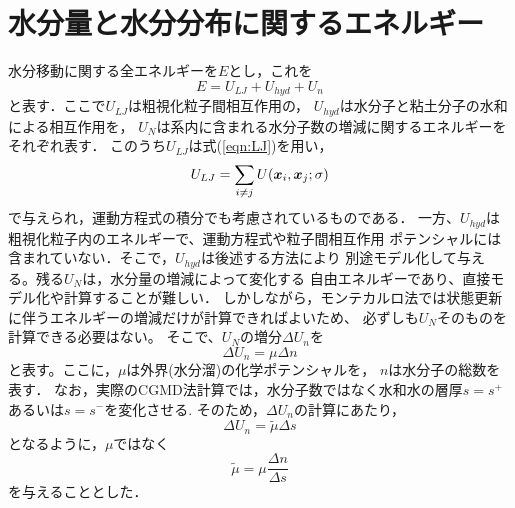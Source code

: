 \section{水分量と水分分布に関するエネルギー}
水分移動に関する全エネルギーを$E$とし，これを
\begin{equation}
	E=U_{LJ} +U_{hyd} + U_n
	\label{eqn:}
\end{equation}
と表す．ここで$U_{LJ}$は粗視化粒子間相互作用の， 
$U_{hyd}$は水分子と粘土分子の水和による相互作用を，
$U_N$は系内に含まれる水分子数の増減に関するエネルギーをそれぞれ表す．
このうち$U_{LJ}$は式(\ref{eqn:LJ})を用い，
\begin{equation}
	U_{LJ}=\sum_{i\neq j} U(\mbox{\boldmath $x$}_i,\mbox{\boldmath $x$}_j;\sigma)
	\label{eqn:}
\end{equation}
で与えられ，運動方程式の積分でも考慮されているものである．
一方、$U_{hyd}$は粗視化粒子内のエネルギーで、運動方程式や粒子間相互作用
ポテンシャルには含まれていない．そこで，$U_{hyd}$は後述する方法により
別途モデル化して与える。残る$U_N$は，水分量の増減によって変化する
自由エネルギーであり、直接モデル化や計算することが難しい．
しかしながら，モンテカルロ法では状態更新に伴うエネルギーの増減だけが計算できればよいため、
必ずしも$U_N$そのものを計算できる必要はない。
そこで、$U_N$の増分$\Delta U_n$を
\begin{equation}
	\Delta U_n =\mu \Delta n
	\label{eqn:}
\end{equation}
と表す。ここに，$\mu$は外界(水分溜)の化学ポテンシャルを，
$n$は水分子の総数を表す．
なお，実際のCGMD法計算では，水分子数ではなく水和水の層厚$s=s^{+}$あるいは$s=s^{-}$を変化させる. 
そのため，$\Delta U_n$の計算にあたり，
\begin{equation}
	\Delta U_n =\tilde \mu \Delta s
	\label{eqn:}
\end{equation}
となるように，$\mu$ではなく
\begin{equation}
	\tilde \mu =\mu \frac{\Delta n}{\Delta s}
	\label{eqn:}
\end{equation}
を与えることとした．
